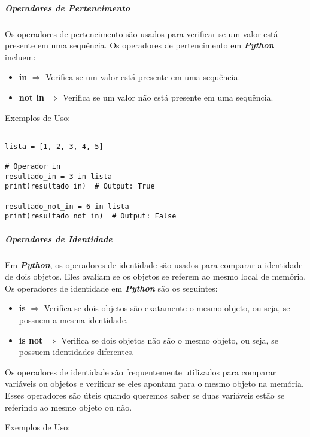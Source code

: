 \documentclass[a4paper, 12pt, onecolumn,singlespacing]{article}
\begin{document}
	\subparagraph{Operadores de Pertencimento}
	\label{python_operadores_pertencimento}
	Os operadores de pertencimento são usados para verificar se um valor está presente em uma sequência. Os operadores de pertencimento em \textbf{\textit{Python}} incluem:

	\begin{itemize}
		\item \textbf{in} $\Rightarrow$ Verifica se um valor está presente em uma sequência.
		\item \textbf{not in} $\Rightarrow$ Verifica se um valor não está presente em uma sequência.
	\end{itemize}	

Exemplos de Uso:

\begin{verbatim}

lista = [1, 2, 3, 4, 5]

# Operador in
resultado_in = 3 in lista
print(resultado_in)  # Output: True

resultado_not_in = 6 in lista
print(resultado_not_in)  # Output: False

\end{verbatim}
	
	\subparagraph{Operadores de Identidade}
	\label{python_operadores_identidade}
	Em \textbf{\textit{Python}}, os operadores de identidade são usados para comparar a identidade de dois objetos. Eles avaliam se os objetos se referem ao mesmo local de memória. Os operadores de identidade em \textbf{\textit{Python}} são os seguintes:
	
	\begin{itemize}
		\item \textbf{is} $\Rightarrow$ Verifica se dois objetos são exatamente o mesmo objeto, ou seja, se possuem a mesma identidade.
		\item \textbf{is not} $\Rightarrow$ Verifica se dois objetos não são o mesmo objeto, ou seja, se possuem identidades diferentes.
	\end{itemize}
	
	Os operadores de identidade são frequentemente utilizados para comparar variáveis ou objetos e verificar se eles apontam para o mesmo objeto na memória. Esses operadores são úteis quando queremos saber se duas variáveis estão se referindo ao mesmo objeto ou não.

Exemplos de Uso:
\end{document}
